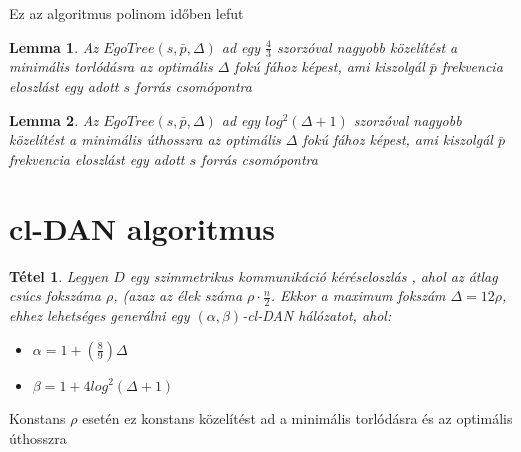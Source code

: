 \documentclass[12pt]{report}
\newtheorem{mytetel}{Tétel}
\newtheorem{mylemma}{Lemma}
\begin{document}
Ez az algoritmus polinom időben lefut

\begin{mylemma}
	Az \(EgoTree(s, \bar{p}, \Delta)\) ad egy \(\frac{4}{3}\) szorzóval nagyobb közelítést a minimális torlódásra az optimális \(\Delta\) fokú fához képest, ami kiszolgál \(\bar{p}\) frekvencia eloszlást egy adott \(s\) forrás csomópontra
\end{mylemma}

\begin{mylemma}
	Az \(EgoTree(s, \bar{p}, \Delta)\) ad egy \(log^2(\Delta + 1)\) szorzóval nagyobb közelítést a minimális úthosszra az optimális \(\Delta\) fokú fához képest, ami kiszolgál \(\bar{p}\) frekvencia eloszlást egy adott \(s\) forrás csomópontra
\end{mylemma}

\section{cl-DAN algoritmus}

\begin{mytetel}
	Legyen \(D\) egy szimmetrikus kommunikáció kéréseloszlás , ahol az átlag csúcs fokszáma \(\rho\), (azaz az élek száma \(\rho \cdot \frac{n}{2}\). Ekkor a maximum fokszám \(\Delta = 12\rho\), ehhez lehetséges generálni egy \((\alpha, \beta)\)-cl-DAN hálózatot, ahol:
	\begin{itemize}
		\item \(\alpha = 1 + (\frac{8}{9})\Delta\)
		\item \(\beta = 1 + 4log^2(\Delta + 1)\)
	\end{itemize}
\end{mytetel}
Konstans \(\rho\) esetén ez konstans közelítést ad a minimális torlódásra és az optimális úthosszra
\end{document}
